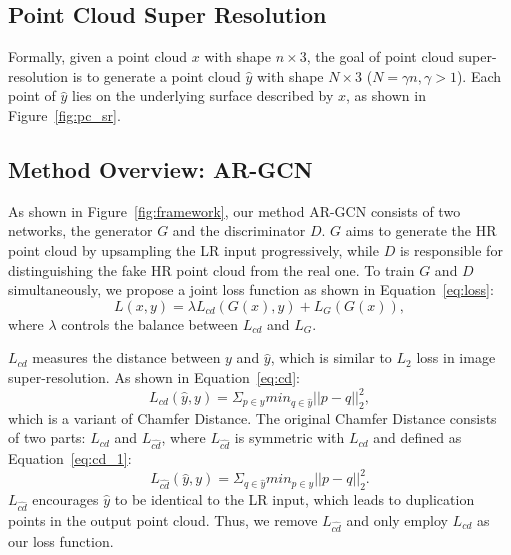\documentclass[10pt,twocolumn,letterpaper]{article}
\begin{document}
\subsection{Point Cloud Super Resolution}
Formally, given a point cloud $x$ with shape $n\times3$, the goal of point cloud super-resolution is to generate a point cloud $\hat{y}$ with shape $N\times3$ ($N = \gamma n, \gamma > 1$).
Each point of $\hat{y}$ lies on the underlying surface described by $x$, as shown in Figure~\ref{fig:pc_sr}.

\subsection{Method Overview: AR-GCN}
As shown in Figure~\ref{fig:framework}, our method AR-GCN consists of two networks, the generator $G$ and the discriminator $D$.
$G$ aims to generate the HR point cloud by upsampling the LR input progressively, while $D$ is responsible for distinguishing the fake HR point cloud from the real one.
To train $G$ and $D$ simultaneously, we propose a joint loss function as shown in Equation~\ref{eq:loss}:
\begin{equation}
    L(x, y) = \lambda L_{cd}(G(x), y) + L_G(G(x)),
    \label{eq:loss}
\end{equation}
where $\lambda$ controls the balance between $L_{cd}$ and $L_{G}$.

$L_{cd}$ measures the distance between $y$ and $\hat{y}$, which is similar to $L_2$ loss in image super-resolution.
As shown in Equation~\ref{eq:cd}:
\begin{equation}
    L_{cd}(\hat{y}, y) = \Sigma_{p \in y} min_{q \in \hat{y}}{||p-q||^2_2},
    \label{eq:cd}
\end{equation}
which is a variant of Chamfer Distance.
The original Chamfer Distance consists of two parts: $L_{cd}$ and $L_{\hat{cd}}$, where $L_{\hat{cd}}$ is symmetric with $L_{cd}$ and defined as Equation~\ref{eq:cd_1}:
\begin{equation}
    L_{\hat{cd}}(\hat{y}, y) = \Sigma_{q \in \hat{y}} min_{p \in y}{||p-q||^2_2}.
    \label{eq:cd_1}
\end{equation}
$L_{\hat{cd}}$ encourages $\hat{y}$ to be identical to the LR input, which leads to duplication points in the output point cloud.
Thus, we remove $L_{\hat{cd}}$ and only employ $L_{cd}$ as our loss function.
\end{document}
